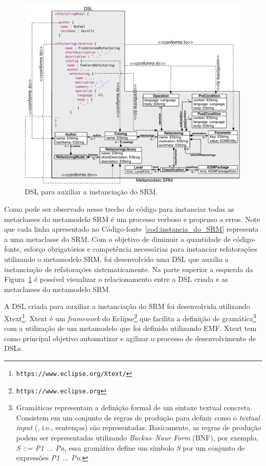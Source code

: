 \begin{figure}[!h]
	\centering
	\caption{DSL para auxiliar a instanciação do SRM.}
	\label{fig:DSL_SRM}
	\includegraphics[scale=0.6]{images/MetaModelEDSL}
	\fautor
\end{figure}

Como pode ser observado nesse trecho de código para instanciar todas as metaclasses do metamodelo SRM é um processo verboso e propenso a erros. Note que cada linha apresentado no Código-fonte~\ref{cod:instancia_do_SRM} representa a uma metaclasse do SRM. Com o objetivo de diminuir a quantidade de código-fonte, esforço obrigatórios e competência necessárias para instanciar refatorações utilizando o metamodelo SRM, foi desenvolvido uma DSL que auxilia a instanciação de refatorações sistematicamente. Na parte superior a esquerda da Figura~\ref{fig:DSL_SRM} é possível visualizar o relacionamento entre a DSL criada e as metaclasses do metamodelo SRM.


A DSL criada para auxiliar a instanciação do SRM foi desenvolvida utilizando Xtext\footnote{\texttt{https://www.eclipse.org/Xtext/}}. Xtext é um \textit{framework} do Eclipse\footnote{\texttt{https://www.eclipse.org}} que facilita a definição de gramática\footnote{Gramáticas representam a definição formal de um sintaxe textual concreta. Consistem em um conjunto de regras de produção para definir como o \textit{textual input} (, i.e., sentenças) são representadas. Basicamente, as regras de produção podem ser representadas utilizando \textit{Backus–Naur Form} (BNF), por exemplo, \textit{S ::= P1 ... Pn}, essa gramática define um símbolo \textit{S} por um conjunto de expressões \textit{P1 ... Pn}.} 
com a utilização de um metamodelo que foi definido utilizando EMF. Xtext tem como principal objetivo automatizar e agilizar o processo de desenvolvimento de DSLs.

